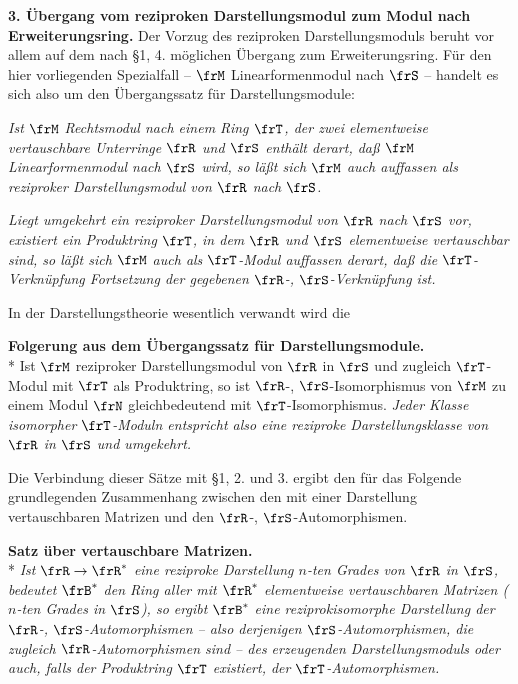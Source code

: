 \noindent\textbf{3. Übergang vom reziproken Darstellungsmodul zum Modul nach Erweiterungsring.} Der Vorzug des reziproken Darstellungsmoduls beruht vor allem auf dem nach §1, 4. möglichen Übergang zum Erweiterungsring. Für den hier vorliegenden Spezialfall -- \(\frM\) Linearformenmodul nach \(\frS\) -- handelt es sich also um den Übergangssatz für Darstellungsmodule:

\emph{Ist \(\frM\) Rechtsmodul nach einem Ring \(\frT\), der zwei elementweise vertauschbare Unterringe \(\frR\) und \(\frS\) enthält derart, daß \(\frM\) Linearformenmodul nach \(\frS\) wird, so läßt sich \(\frM\) auch auffassen als reziproker Darstellungsmodul von \(\frR\) nach \(\frS\).}

\emph{Liegt umgekehrt ein reziproker Darstellungsmodul von \(\frR\) nach \(\frS\) vor, existiert ein Produktring \(\frT\), in dem \(\frR\) und \(\frS\) elementweise vertauschbar sind, so läßt sich \(\frM\) auch als \(\frT\)-Modul auffassen derart, daß die \(\frT\)-Verknüpfung Fortsetzung der gegebenen \(\frR\)-, \(\frS\)-Verknüpfung ist.}

In der Darstellungstheorie wesentlich verwandt wird die

\noindent\textbf{Folgerung aus dem Übergangssatz für Darstellungsmodule.}\\*
Ist \(\frM\) reziproker Darstellungsmodul von \(\frR\) in \(\frS\) und zugleich \(\frT\)-Modul mit \(\frT\) als Produktring, so ist \(\frR\)-, \(\frS\)-Isomorphismus von \(\frM\) zu einem Modul \(\frN\) gleichbedeutend mit \(\frT\)-Isomorphismus. \emph{Jeder Klasse isomorpher \(\frT\)-Moduln entspricht also eine reziproke Darstellungsklasse von \(\frR\) in \(\frS\) und umgekehrt.}

Die Verbindung dieser Sätze mit §1, 2. und 3. ergibt den für das Folgende grundlegenden Zusammenhang zwischen den mit einer Darstellung vertauschbaren Matrizen und den \(\frR\)-, \(\frS\)-Automorphismen.

\noindent\textbf{Satz über vertauschbare Matrizen.}\\*
\emph{Ist \(\frR\to\frR^*\) eine reziproke Darstellung \(n\)-ten Grades von \(\frR\) in \(\frS\), bedeutet \(\frB^*\) den Ring aller mit \(\frR^*\) elementweise vertauschbaren Matrizen (\(n\)-ten Grades in \(\frS\)), so ergibt \(\frB^*\) eine reziprokisomorphe Darstellung der \(\frR\)-, \(\frS\)-Automorphismen -- also derjenigen \(\frS\)-Automorphismen, die zugleich \(\frR\)-Automorphismen sind -- des erzeugenden Darstellungsmoduls oder auch, falls der Produktring \(\frT\) existiert, der \(\frT\)-Automorphismen.}

